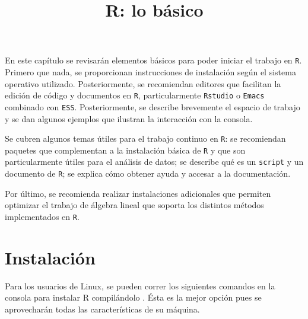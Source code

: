 \documentclass[]{article}
\title{R: lo básico}
\author{}
\date{}
\begin{document}
En este capítulo se revisarán elementos básicos para poder iniciar el
trabajo en \texttt{R}. Primero que nada, se proporcionan instrucciones
de instalación según el sistema operativo utilizado. Posteriormente, se
recomiendan editores que facilitan la edición de código y documentos en
\texttt{R}, particularmente \texttt{Rstudio} o \texttt{Emacs} combinado
con \texttt{ESS}. Posteriormente, se describe brevemente el espacio de
trabajo y se dan algunos ejemplos que ilustran la interacción con la
consola.

Se cubren algunos temas útiles para el trabajo continuo en \texttt{R}:
se recomiendan paquetes que complementan a la instalación básica de
\texttt{R} y que son particularmente útiles para el análisis de datos;
se describe qué es un \texttt{script} y un documento de \texttt{R}; se
explica cómo obtener ayuda y accesar a la documentación.

Por último, se recomienda realizar instalaciones adicionales que
permiten optimizar el trabajo de álgebra lineal que soporta los
distintos métodos implementados en \texttt{R}.

\section{Instalación}\label{instalacion}

Para los usuarios de Linux, se pueden correr los siguientes comandos en
la consola para instalar R compilándolo \parencite{instalarcompilado}.
Ésta es la mejor opción pues se aprovecharán todas las características
de su máquina.
\end{document}
